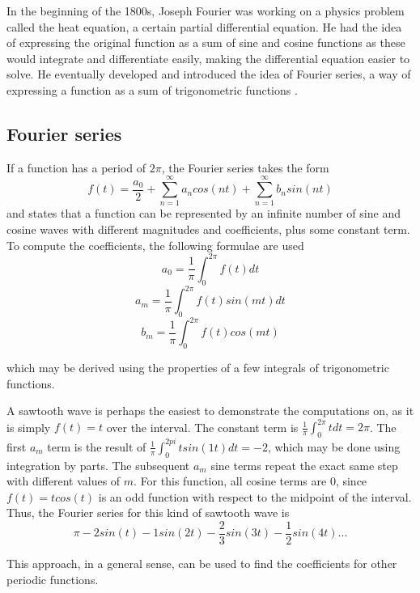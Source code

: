 In the beginning of the 1800s, Joseph Fourier was working on a physics problem called the heat equation, a certain partial differential equation. He had the idea of expressing the original function as a sum of sine and cosine functions as these would integrate and differentiate easily, making the differential equation easier to solve. He eventually developed and introduced the idea of Fourier series, a way of expressing a function as a sum of trigonometric functions \cite{Bounchaleun2019}.

\subsection{Fourier series} 
If a function has a period of $2\pi$, the Fourier series takes the form $$f(t) = \frac{a_0}{2} + \sum_{n=1}^{\infty}a_ncos(nt)+\sum_{n=1}^{\infty}b_nsin(nt)$$ and states that a function can be represented by an infinite number of sine and cosine waves with different magnitudes and coefficients, plus some constant term. To compute the coefficients, the following formulae are used
$$a_0 = \frac{1}{\pi}\int_0^{2\pi} f(t)dt$$
$$a_m = \frac{1}{\pi}\int_0^{2\pi} f(t) sin(mt)dt$$
$$b_m = \frac{1}{\pi}\int_0^{2\pi} f(t) cos(mt)$$

which may be derived using the properties of a few integrals of trigonometric functions.

A sawtooth wave is perhaps the easiest to demonstrate the computations on, as it is simply $f(t) = t$ over the interval. The constant term is $\frac{1}{\pi}\int_0^{2\pi} t dt = 2\pi$. The first $a_m$ term is the result of $\frac{1}{\pi}\int_0^{2pi} t sin(1t)dt = -2$, which may be done using integration by parts. The subsequent $a_m$ sine terms repeat the exact same step with different values of $m$. For this function, all cosine terms are 0, since $f(t)=tcos(t)$ is an odd function with respect to the midpoint of the interval. Thus, the Fourier series for this kind of sawtooth wave is
$$\pi -2sin(t) -1sin(2t)-\frac{2}{3}sin(3t) - \frac{1}{2}sin(4t) ...$$

This approach, in a general sense, can be used to find the coefficients for other periodic functions.
 

